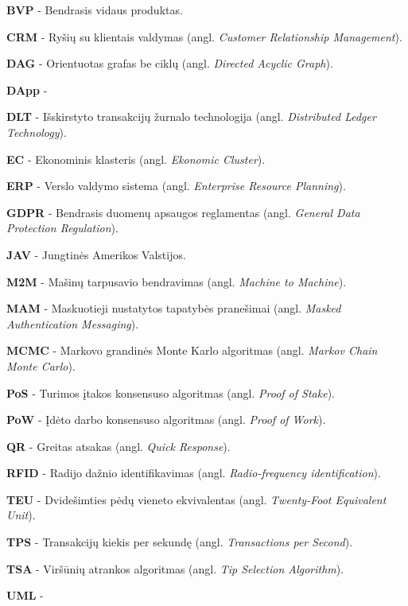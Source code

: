 
\noindent \textbf{BVP} - Bendrasis vidaus produktas.

\noindent \textbf{CRM} - Ryšių su klientais valdymas (angl. \textit{Customer Relationship Management}).

\noindent \textbf{DAG} - Orientuotas grafas be ciklų (angl. \textit{Directed Acyclic Graph}).

\noindent \textbf{DApp} - 

\noindent \textbf{DLT} - Išskirstyto transakcijų žurnalo technologija (angl. \textit{Distributed Ledger Technology}).

\noindent \textbf{EC} - Ekonominis klasteris (angl. \textit{Ekonomic Cluster}).

\noindent \textbf{ERP} - Verslo valdymo sistema (angl. \textit{Enterprise Resource Planning}).

\noindent \textbf{GDPR} - Bendrasis duomenų apsaugos reglamentas (angl. \textit{General Data Protection Regulation}).

\noindent \textbf{JAV} - Jungtinės Amerikos Valstijos.

\noindent \textbf{M2M} - Mašinų tarpusavio bendravimas (angl. \textit{Machine to Machine}).

\noindent \textbf{MAM} - Maskuotieji nustatytos tapatybės pranešimai (angl. \textit{Masked Authentication Messaging}).

\noindent \textbf{MCMC} - Markovo grandinės Monte Karlo algoritmas (angl. \textit{Markov Chain Monte Carlo}).

\noindent \textbf{PoS} - Turimos įtakos konsensuso algoritmas (angl. \textit{Proof of Stake}).

\noindent \textbf{PoW} - Įdėto darbo konsensuso algoritmas (angl. \textit{Proof of Work}).

\noindent \textbf{QR} - Greitas atsakas (angl. \textit{Quick Response}).

\noindent \textbf{RFID} - Radijo dažnio identifikavimas (angl. \textit{Radio-frequency identification}).

\noindent \textbf{TEU} - Dvidešimties pėdų vieneto ekvivalentas (angl. \textit{Twenty-Foot Equivalent Unit}).

\noindent \textbf{TPS} - Transakcijų kiekis per sekundę (angl. \textit{Transactions per Second}).

\noindent \textbf{TSA} - Viršūnių atrankos algoritmas (angl. \textit{Tip Selection Algorithm}).

\noindent \textbf{UML} -